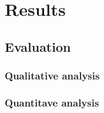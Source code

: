 \chapter{Results}
\label{chap:results}
\begin{spacing}{1.5}

\section{Evaluation}
\subsection{Qualitative analysis}
\subsection{Quantitave analysis}

\end{spacing}